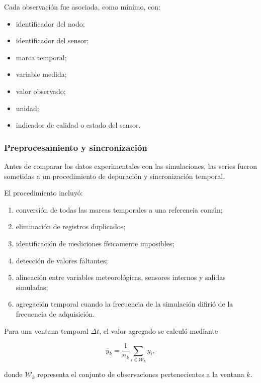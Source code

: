 Cada observación fue asociada, como mínimo, con:

\begin{itemize}
    \item identificador del nodo;
    \item identificador del sensor;
    \item marca temporal;
    \item variable medida;
    \item valor observado;
    \item unidad;
    \item indicador de calidad o estado del sensor.
\end{itemize}

\subsubsection{Preprocesamiento y sincronización}
\label{subsubsec:preprocesamiento_sincronizacion}

Antes de comparar los datos experimentales con las simulaciones, las series fueron sometidas a un procedimiento de depuración y sincronización temporal.

El procedimiento incluyó:

\begin{enumerate}
    \item conversión de todas las marcas temporales a una referencia común;
    \item eliminación de registros duplicados;
    \item identificación de mediciones físicamente imposibles;
    \item detección de valores faltantes;
    \item alineación entre variables meteorológicas, sensores internos y salidas simuladas;
    \item agregación temporal cuando la frecuencia de la simulación difirió de la frecuencia de adquisición.
\end{enumerate}

Para una ventana temporal $\Delta t$, el valor agregado se calculó mediante

\begin{equation}
\overline{y}_k
=
\frac{1}{n_k}
\sum_{i\in\mathcal{W}_k}y_i,
\label{eq:agregacion_temporal}
\end{equation}

donde $\mathcal{W}_k$ representa el conjunto de observaciones pertenecientes a la ventana $k$.

